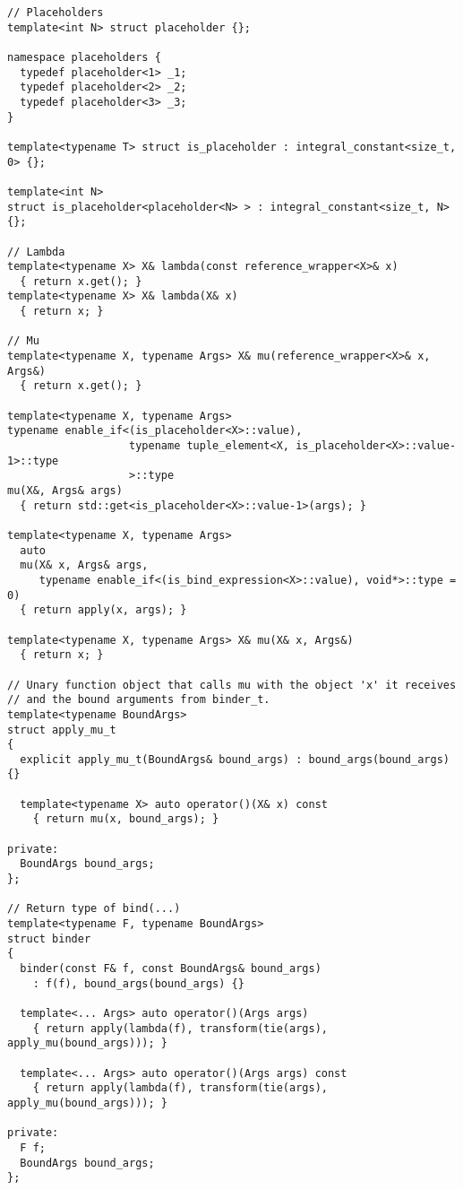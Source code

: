 \documentclass{article}
\begin{document}
\small
\begin{verbatim}
// Placeholders
template<int N> struct placeholder {};

namespace placeholders {
  typedef placeholder<1> _1;
  typedef placeholder<2> _2;
  typedef placeholder<3> _3;
}

template<typename T> struct is_placeholder : integral_constant<size_t, 0> {};

template<int N> 
struct is_placeholder<placeholder<N> > : integral_constant<size_t, N> {};

// Lambda
template<typename X> X& lambda(const reference_wrapper<X>& x)
  { return x.get(); }
template<typename X> X& lambda(X& x)
  { return x; }

// Mu
template<typename X, typename Args> X& mu(reference_wrapper<X>& x, Args&)
  { return x.get(); }

template<typename X, typename Args>
typename enable_if<(is_placeholder<X>::value),
                   typename tuple_element<X, is_placeholder<X>::value-1>::type
                   >::type
mu(X&, Args& args)
  { return std::get<is_placeholder<X>::value-1>(args); }

template<typename X, typename Args>
  auto 
  mu(X& x, Args& args, 
     typename enable_if<(is_bind_expression<X>::value), void*>::type = 0)
  { return apply(x, args); }

template<typename X, typename Args> X& mu(X& x, Args&)
  { return x; }

// Unary function object that calls mu with the object 'x' it receives
// and the bound arguments from binder_t.
template<typename BoundArgs>
struct apply_mu_t
{
  explicit apply_mu_t(BoundArgs& bound_args) : bound_args(bound_args) {}

  template<typename X> auto operator()(X& x) const
    { return mu(x, bound_args); }

private:
  BoundArgs bound_args;
};

// Return type of bind(...)
template<typename F, typename BoundArgs>
struct binder
{
  binder(const F& f, const BoundArgs& bound_args)
    : f(f), bound_args(bound_args) {}

  template<... Args> auto operator()(Args args)
    { return apply(lambda(f), transform(tie(args), apply_mu(bound_args))); }

  template<... Args> auto operator()(Args args) const
    { return apply(lambda(f), transform(tie(args), apply_mu(bound_args))); }

private:
  F f;
  BoundArgs bound_args;
};


\end{verbatim}
\end{document}
